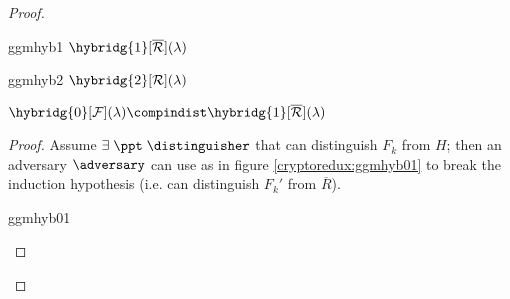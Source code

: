 \begin{proof}
\begin{cryptogame}
    \end{cryptogame}

    \begin{cryptogame}
        {ggmhyb1}
        {$\hybridg{1}[\overline{\R}](\lambda)$}
        {}


    \end{cryptogame}

    \begin{cryptogame}
        {ggmhyb2}
        {$\hybridg{2}[\R](\lambda)$}
        {}


    \end{cryptogame}
    

    \begin{lemma}
        $\hybridg{0}[\F](\lambda) \compindist \hybridg{1}[\overline{\R}](\lambda)$       
    \end{lemma}

    \begin{proof}
        Assume $\exists\; \ppt\; \distinguisher$ that can distinguish $F_k$ from $H$; then an adversary $\adversary$ can use \distinguisher{} as in figure \ref{cryptoredux:ggmhyb01} to break the induction hypothesis (i.e. can distinguish $F_k'$ from $\overline{R}$).

        \begin{cryptoredux}
            {ggmhyb01}
            {}
            {}
            {}



\end{cryptoredux}
\end{proof}
\end{proof}

